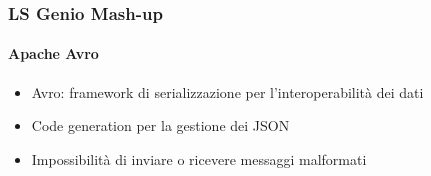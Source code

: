 \documentclass{beamer}
\begin{document}


%		
%		
%

\begin{frame}
\frametitle{LS Genio Mash-up}
	\framesubtitle{Apache Avro}
	\begin{itemize}
		\item Avro: framework di serializzazione per l'interoperabilità dei dati
		\item Code generation per la gestione dei JSON
		\item Impossibilità di inviare o ricevere messaggi malformati
	\end{itemize}
\end{frame}
\end{document}

